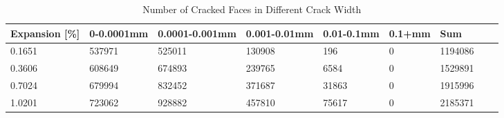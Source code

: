 
\begin{table}[ht!]
    \centering
    \begin{tabular}{| p{2.0cm} | p{1.6cm} | p{1.6cm} | p{1.6cm} | p{1.6cm} | p{1.6cm} | p{1.6cm} | p{1.6cm} | p{2.0cm} | }
    \hline

	Expansion [\%] & 0-0.0001mm & 0.0001-0.001mm & 0.001-0.01mm & 0.01-0.1mm & 0.1+mm & Sum \\ \hline

    0.1651 &	537971 &	525011 &	130908 &	196 &	0 &	1194086\\ \hline
    0.3606 &	608649 &	674893 &	239765 &	6584 &	0 &	1529891\\ \hline
    0.7024 &	679994 &	832452 &	371687 &	31863 &	0 &	1915996\\ \hline
    1.0201 &	723062 &	928882 &	457810 &	75617 &	0 &	2185371\\ \hline


    \end{tabular}
    \caption{Number of Cracked Faces in Different Crack Width}
    \label{}
\end{table}



